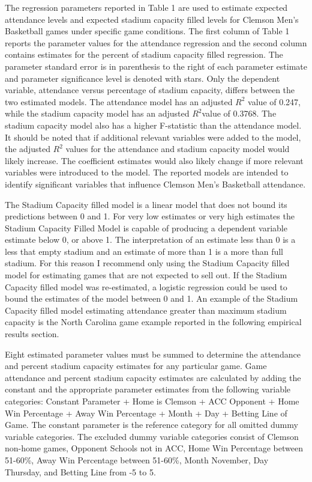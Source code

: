 \documentclass[preprint,12pt,times]{elsarticle}
\begin{document}
The regression parameters reported in Table 1 are used to estimate expected attendance levels and expected stadium capacity filled levels for Clemson Men's Basketball games under specific game conditions.  The first column of Table 1 reports the parameter values for the attendance regression and the second column contains estimates for the percent of stadium capacity filled regression.  The parameter standard error is in parenthesis to the right of each parameter estimate and parameter significance level is denoted with stars.  Only the dependent variable, attendance versus percentage of stadium capacity, differs between the two estimated models.  The attendance model has an adjusted $R^2$ value of 0.247, while the stadium capacity model has an adjusted $R^2 $value of 0.3768.  The stadium capacity model also has a higher F-statistic than the attendance model.  It should be noted that if additional relevant variables were added to the model, the adjusted $R^2$ values for the attendance and stadium capacity model would likely increase.  The coefficient estimates would also likely change if more relevant variables were introduced to the model.  The reported models are intended to identify significant variables that influence Clemson Men's Basketball attendance.

The Stadium Capacity filled model is a linear model that does not bound its predictions between 0 and 1.  For very low estimates or very high estimates the Stadium Capacity Filled Model is capable of producing a dependent variable estimate below 0, or above 1.  The interpretation of an estimate less than 0 is a less that empty stadium and an estimate of more than 1 is a more than full stadium.  For this reason I recommend only using the Stadium Capacity filled model for estimating games that are not expected to sell out.  If the Stadium Capacity filled model was re-estimated, a logistic regression could be used to bound the estimates of the model between 0 and 1.  An example of the Stadium Capacity filled model estimating attendance greater than maximum stadium capacity is the North Carolina game example reported in the following empirical results section.

Eight estimated parameter values must be summed to determine the attendance and percent stadium capacity estimates for any particular game.  Game attendance and percent stadium capacity estimates are calculated by adding the constant and the appropriate parameter estimates from the following variable categories: Constant Parameter + Home is Clemson + ACC Opponent + Home Win Percentage + Away Win Percentage + Month + Day + Betting Line of Game.  The constant parameter is the reference category for all omitted dummy variable categories.  The excluded dummy variable categories consist of Clemson non-home games, Opponent Schools not in ACC, Home Win Percentage between 51-60\%, Away Win Percentage between 51-60\%, Month November, Day Thursday, and Betting Line from -5 to 5.\\
\end{document}
